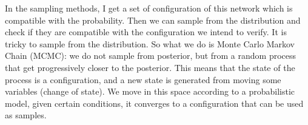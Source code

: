 In the sampling methods, I get a set of configuration of this network which is
compatible with the probability. Then we can sample from the distribution and check
if they are compatible with the configuration we intend to verify. It is tricky
to sample from the distribution. So what we do is Monte Carlo Markov Chain (MCMC):
we do not sample from posterior, but from a random process that get progressively
closer to the posterior. This means that the state of the process is a
configuration, and a new state is generated from moving some variables (change
of state). We move in this space according to a probabilistic model, given certain
conditions, it converges to a configuration that can be used as samples.